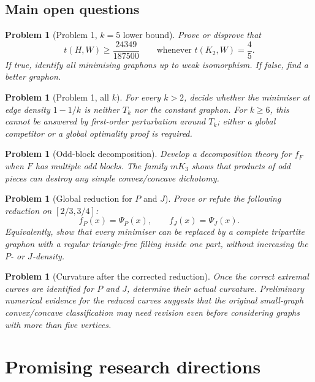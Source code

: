 \documentclass[11pt]{amsart}
\newtheorem{problem}[theorem]{Problem}
\theoremstyle{definition}
\newcommand{\1}{\mathbf 1}
\begin{document}
\subsection{Main open questions}

\begin{problem}[Problem 1, $k=5$ lower bound]
Prove or disprove that
\[
   t(H,W)\ge \frac{24349}{187500}
   \qquad\text{whenever }t(K_2,W)=\frac45.
\]
If true, identify all minimising graphons up to weak isomorphism.  If false, find a better graphon.
\end{problem}

\begin{problem}[Problem 1, all $k$]
For every $k>2$, decide whether the minimiser at edge density $1-1/k$ is neither $T_k$ nor the constant graphon.  For $k\ge 6$, this cannot be answered by first-order perturbation around $T_k$; either a global competitor or a global optimality proof is required.
\end{problem}

\begin{problem}[Odd-block decomposition]
Develop a decomposition theory for $f_F$ when $F$ has multiple odd blocks.  The family $mK_3$ shows that products of odd pieces can destroy any simple convex/concave dichotomy.
\end{problem}

\begin{problem}[Global reduction for $P$ and $J$]
Prove or refute the following reduction on $[2/3,3/4]$:
\[
   f_P(x)=\Psi_P(x),
   \qquad f_J(x)=\Psi_J(x).
\]
Equivalently, show that every minimiser can be replaced by a complete tripartite graphon with a regular triangle-free filling inside one part, without increasing the $P$- or $J$-density.
\end{problem}

\begin{problem}[Curvature after the corrected reduction]
Once the correct extremal curves are identified for $P$ and $J$, determine their actual curvature.  Preliminary numerical evidence for the reduced curves suggests that the original small-graph convex/concave classification may need revision even before considering graphs with more than five vertices.
\end{problem}

\section{Promising research directions}
\end{document}

